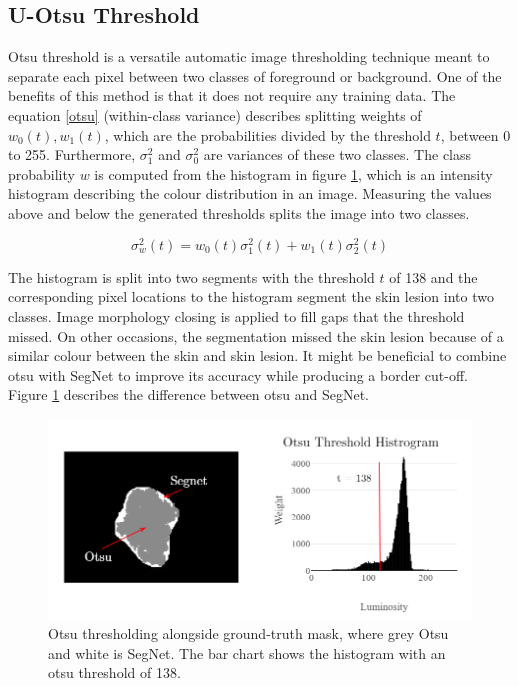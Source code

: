 \subsection{U-Otsu Threshold}
Otsu threshold is a versatile automatic image thresholding technique meant to separate each pixel between two classes of foreground or background. One of the benefits of this method is that it does not require any training data. The equation \ref{otsu} (within-class variance) describes splitting weights of $w_0(t),w_1(t)$, which are the probabilities divided by the threshold $t$, between 0 to 255. Furthermore, $\sigma_1^2$ and $\sigma_0^2$ are variances of these two classes. The class probability $w$ is computed from the histogram in figure \ref{otsu2}, which is an intensity histogram describing the colour distribution in an image. Measuring the values above and below the generated thresholds splits the image into two classes.

\begin{equation} \label{otsu}
\sigma_w^2(t) = w_0(t)\sigma_1^2(t) + w_1(t)\sigma_2^2(t)
\end{equation}

The histogram is split into two segments with the threshold $t$ of 138 and the corresponding pixel locations to the histogram segment the skin lesion into two classes. Image morphology closing is applied to fill gaps that the threshold missed. On other occasions, the segmentation missed the skin lesion because of a similar colour between the skin and skin lesion. It might be beneficial to combine otsu with SegNet to improve its accuracy while producing a border cut-off. Figure \ref{otsu2} describes the difference between otsu and SegNet.

\begin{figure}
\centering
\includegraphics[scale=0.7]{images/otsu3.png}
\caption{Otsu thresholding alongside ground-truth mask, where grey Otsu and white is SegNet. The bar chart shows the histogram with an otsu threshold of 138.} \label{otsu2}
\end{figure}


